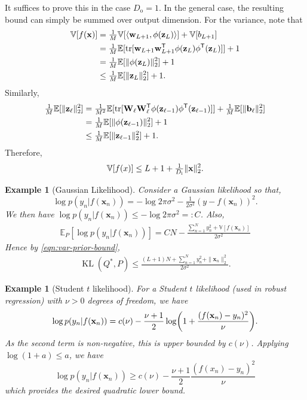 \documentclass[twoside]{article}
\renewcommand{\ss}[1]{_{\text{#1}}}
\newcommand{\vb}{\mathbf{b}}
\newcommand{\vw}{\mathbf{w}}
\newcommand{\vx}{\mathbf{x}}
\newcommand{\vz}{\mathbf{z}}
\newcommand{\mW}{\mathbf{W}}
\newcommand{\E}{\mathbb{E}}
\renewcommand{\P}{\mathbb{P}}
\renewcommand{\P}{\ensuremath{P}}
\newcommand{\V}{\mathbb{V}}
\newcommand{\T}{\text{\textsf{T}}}
\newcommand{\opspace}{}
\newcommand{\KL}{\operatorname{KL}}
\newcommand{\tr}{\operatorname{tr}\opspace}
\renewcommand{\ss}[1]{_{\text{#1}}}        %
\DeclarePairedDelimiter\parens{(}{)}             %
\DeclarePairedDelimiter\lra{\langle}{\rangle}    %
\DeclarePairedDelimiter\norm{\|}{\|}             %
\theoremstyle{theoremstyle}
\newtheorem{example}[theorem]{Example}
\begin{document}
It suffices to prove this in the case $D\ss{o}=1$. In the general case, the resulting bound can simply be summed over output dimension. For the variance, note that
\begin{align}
    \V[f(\vx)]
    &= \tfrac1M\V[\lra{\vw_{L+1}, \phi(\vz_L)}] + \V[b_{L+1}] \\
    &= \tfrac1M\E[\tr[\vw_{L+1} \vw_{L+1}^\T \phi(\vz_L) \phi^\T(\vz_L)]] + 1 \\
    &= \tfrac1M\E[\norm{\phi(\vz_L)}^2_2] + 1 \\
    &\le \tfrac1M\E[\norm{\vz_L}^2_2] + 1.
\end{align}
Similarly,
\begin{align}
    \tfrac1M\E[\norm{\vz_\ell}^2_2]
    &= \tfrac1{M^2}\E[\tr[\mW_{\ell} \mW^\T_{\ell} \phi(\vz_{\ell - 1}) \phi^\T(\vz_{\ell - 1})] ]+ \tfrac1M\E[\norm{\vb_{\ell}}^2_2] \\
    &= \tfrac1M\E[\norm{\phi(\vz_{\ell - 1})}_2^2] + 1 \\
    &\le \tfrac1M\E[\norm{\vz_{\ell - 1}}_2^2] + 1.
\end{align}
Therefore,
\begin{equation}
    \V[f(x)] \le L + 1 + \tfrac{1}{D\ss{i}}\norm{\vx}_2^2. \label{eqn:var-prior-bound}
\end{equation}
\begin{example}[Gaussian Likelihood]
Consider a Gaussian likelihood so that,
\begin{equation}
    \log p(y_n | f(\vx_n)) = -\log 2 \pi \sigma^2 - \tfrac{1}{2\sigma^2}(y-f(\vx_n))^2.
\end{equation}
We then have $\log p(y_n | f(\vx_n)) \leq -\log 2 \pi \sigma^2=:C$. Also, 
\begin{align}
    \mathbb{E}_{\P}[\log p(y_n | f(\vx_n))] = CN - \frac{\sum_{n=1}^N y_n^2+\V[f(\vx_n)]}{2\sigma^2}
\end{align}
Hence by \cref{eqn:var-prior-bound},
\begin{align}
     \KL(Q^*, P) \leq \frac{(L+1)N+ \sum_{n=1}^{N} y_n^2 + \|\vx_n\|^2_2 }{2\sigma^2}. \label{eqn:kl-upper-bound-gaussian}
\end{align}
\end{example}

\begin{example}[Student $t$ likelihood]
    For a Student $t$ likelihood (used in robust regression) with $\nu >0$ degrees of freedom, we have
    \begin{equation}
        \log p(y_n
        |f(\vx_n)) = c(\nu) - \frac{\nu+1}{2} \log \parens*{1+\frac{(f(\vx_n)-y_n)^2}{\nu}}.
    \end{equation}
    As the second term is non-negative, this is upper bounded by $c(\nu)$. 
    Applying $\log (1+a) \leq a$, we have
    \begin{equation}
        \log p(y_n
        |f(\vx_n)) \geq c(\nu) - \frac{\nu+1}{2}\frac{ (f(x_n)-y_n)^2}{\nu}
    \end{equation}
    which provides the desired quadratic lower bound.
\end{example}
\end{document}
